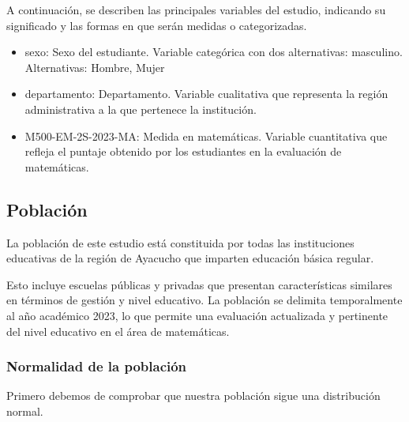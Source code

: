\documentclass[
]{article}
\begin{document}
A continuación, se describen las principales variables del estudio,
indicando su significado y las formas en que serán medidas o
categorizadas.

\begin{itemize}
    \item sexo: Sexo del estudiante. Variable categórica con dos alternativas: masculino. Alternativas: Hombre, Mujer
    \item departamento: Departamento. Variable cualitativa que representa la región administrativa a la que pertenece la institución.
    \item M500-EM-2S-2023-MA: Medida en matemáticas. Variable cuantitativa que refleja el puntaje obtenido por los estudiantes en la evaluación de matemáticas.

\end{itemize}

\subsection*{Población}\label{poblaciuxf3n}

La población de este estudio está constituida por todas las
instituciones educativas de la región de Ayacucho que imparten educación
básica regular.

Esto incluye escuelas públicas y privadas que presentan características
similares en términos de gestión y nivel educativo. La población se
delimita temporalmente al año académico 2023, lo que permite una
evaluación actualizada y pertinente del nivel educativo en el área de
matemáticas.

\subsubsection*{Normalidad de la
población}\label{normalidad-de-la-poblaciuxf3n}

Primero debemos de comprobar que nuestra población sigue una
distribución normal.
\end{document}
